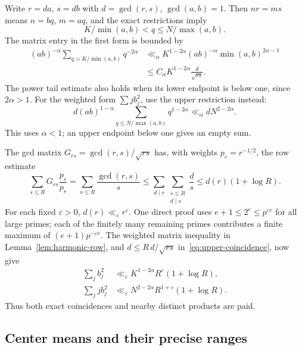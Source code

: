 Write $r=da$, $s=db$ with $d=\gcd(r,s)$, $\gcd(a,b)=1$.
Then $nr=ms$ means $n=bq$, $m=aq$, and the exact restrictions imply
\[
 K/\min(a,b)<q\le N/\max(a,b).
\]
The matrix entry in the first form is bounded by
\begin{align}
 (ab)^{-\alpha}\sum_{q>K/\min(a,b)}q^{-2\alpha}
 &\ll_\alpha K^{1-2\alpha}(ab)^{-\alpha}\min(a,b)^{2\alpha-1}
 \nonumber\\
 &\le C_\alpha K^{1-2\alpha}\frac{d}{\sqrt{rs}}.
 \label{eq:lower-coincidence}
\end{align}
The power tail estimate also holds when its lower endpoint is below
one, since $2\alpha>1$. For the weighted form $\sum j b_j^2$, use
the upper restriction instead:
\begin{equation}\label{eq:upper-coincidence}
 d(ab)^{1-\alpha}\sum_{q\le N/\max(a,b)}q^{1-2\alpha}
 \ll_\alpha dN^{2-2\alpha}.
\end{equation}
This uses $\alpha<1$; an upper endpoint below one gives an empty sum.

The gcd matrix $G_{rs}=\gcd(r,s)/\sqrt{rs}$ has, with weights
$p_r=r^{-1/2}$, the row estimate
\[
 \sum_{s\le R}G_{rs}\frac{p_s}{p_r}
 =\sum_{s\le R}\frac{\gcd(r,s)}s
 \le\sum_{d\mid r}\sum_{\substack{s\le R\\d\mid s}}\frac ds
 \le d(r)(1+\log R).
\]
For each fixed $\varepsilon>0$, $d(r)\ll_\varepsilon r^\varepsilon$.
One direct proof uses $e+1\le2^e\le p^{\varepsilon e}$ for all
large primes; each of the finitely many remaining primes contributes
a finite maximum of $(e+1)p^{-\varepsilon e}$.
The weighted matrix inequality in Lemma~\ref{lem:harmonic-row},
and $d\le R\,d/\sqrt{rs}$ in~\eqref{eq:upper-coincidence}, now give
\begin{equation}\label{eq:coincidence-forms}
 \begin{split}
 \sum_jb_j^2&\ll_\varepsilon K^{1-2\alpha}R^\varepsilon(1+\log R),\\
 \sum_jj b_j^2&\ll_\varepsilon
          N^{2-2\alpha}R^{1+\varepsilon}(1+\log R).
 \end{split}
\end{equation}
Thus both exact coincidences and nearby distinct products are paid.

\subsection{Center means and their precise ranges}

